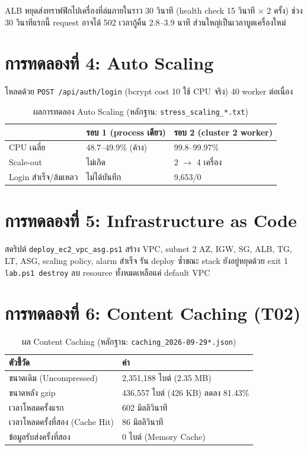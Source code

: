 \documentclass[12pt,a4paper]{report}
\begin{document}
ALB หยุดส่งทราฟฟิกไปเครื่องที่ล่มภายในราว 30 วินาที (health check 15 วินาที $\times$ 2 ครั้ง) ช่วง 30 วินาทีแรกนี้ request อาจได้ 502 เวลากู้คืน 2.8--3.9 นาที ส่วนใหญ่เป็นเวลาบูตเครื่องใหม่

\section{การทดลองที่ 4: Auto Scaling}

โหลดด้วย \texttt{POST /api/auth/login} (bcrypt cost 10 ใช้ CPU จริง) 40 worker ต่อเนื่อง

\begin{table}[H]
\centering
\caption{ผลการทดลอง Auto Scaling (หลักฐาน: \texttt{stress\_scaling\_*.txt})}
\begin{tabularx}{\textwidth}{lXX}
\toprule
& \textbf{รอบ 1 (process เดียว)} & \textbf{รอบ 2 (cluster 2 worker)} \\
\midrule
CPU เฉลี่ย & 48.7--49.9\% (ค้าง) & 99.8--99.97\% \\
Scale-out & ไม่เกิด & 2 $\rightarrow$ 4 เครื่อง \\
Login สำเร็จ/ล้มเหลว & ไม่ได้บันทึก & 9,653/0 \\
\bottomrule
\end{tabularx}
\end{table}

\section{การทดลองที่ 5: Infrastructure as Code}

สคริปต์ \texttt{deploy\_ec2\_vpc\_asg.ps1} สร้าง VPC, subnet 2 AZ, IGW, SG, ALB, TG, LT, ASG, scaling policy, alarm สำเร็จ รัน deploy ซ้ำขณะ stack ยังอยู่หยุดด้วย exit 1 \texttt{lab.ps1 destroy} ลบ resource ทั้งหมดเหลือแค่ default VPC

\section{การทดลองที่ 6: Content Caching (T02)}

\begin{table}[H]
\centering
\caption{ผล Content Caching (หลักฐาน: \texttt{caching\_2026-09-29*.json})}
\begin{tabularx}{\textwidth}{lX}
\toprule
\textbf{ตัวชี้วัด} & \textbf{ค่า} \\
\midrule
ขนาดเดิม (Uncompressed) & 2,351,188 ไบต์ (2.35 MB) \\
ขนาดหลัง gzip & 436,557 ไบต์ (426 KB) ลดลง 81.43\% \\
เวลาโหลดครั้งแรก & 602 มิลลิวินาที \\
เวลาโหลดครั้งที่สอง (Cache Hit) & 86 มิลลิวินาที \\
ข้อมูลรับส่งครั้งที่สอง & 0 ไบต์ (Memory Cache) \\
\bottomrule
\end{tabularx}
\end{table}
\end{document}

